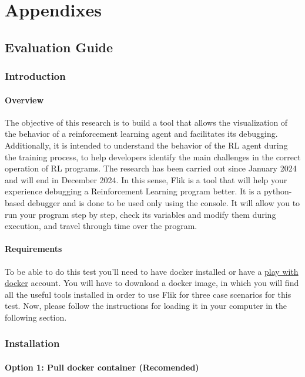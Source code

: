 
\chapter{Appendixes}

\section{Evaluation Guide}

\subsection{Introduction}
\subsubsection{Overview}
The objective of this research is to build a tool that allows the visualization of the behavior of a reinforcement learning agent and facilitates its debugging. Additionally, it is intended to understand the behavior of the RL agent during the training process, to help developers identify the main challenges in the correct operation of RL programs. The research has been carried out since January 2024 and will end in December 2024.
In this sense, Flik is a tool that will help your experience debugging a Reinforcement Learning program better. It is a python-based debugger and is done to be used only using the console. It will allow you to run your program step by step, check its variables and modify them during execution, and travel through time over the program.

\subsubsection{Requirements}
To be able to do this test you'll need to have docker installed or have a \href{https://labs.play-with-docker.com/}{play with docker} account. You will have to download a docker image, in which you will find all the useful tools installed in order to use Flik for three case scenarios for this test. Now, please follow the instructions for loading it in your computer in the following section.

\subsection{Installation}

\subsubsection{Option 1: Pull docker container (Recomended)}

